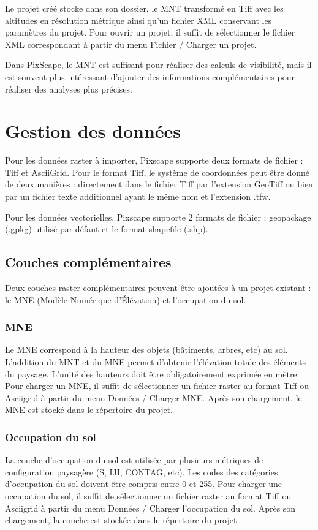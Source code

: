 \documentclass{report}
\begin{document}
Le projet créé stocke dans son dossier, le MNT transformé en Tiff avec les altitudes en résolution métrique ainsi qu'un fichier XML conservant les paramètres du projet.
Pour ouvrir un projet, il suffit de sélectionner le fichier XML correspondant à partir du menu Fichier / Charger un projet.

Dans PixScape, le MNT est suffisant pour réaliser des calculs de visibilité, mais il est souvent plus intéressant d'ajouter des informations complémentaires pour réaliser des analyses plus précises.

\section{Gestion des données}

Pour les données raster à importer, Pixscape supporte deux formats de fichier : Tiff et AsciiGrid. Pour le format Tiff, le système de coordonnées peut être donné de deux manières : directement dans le fichier Tiff par l'extension GeoTiff ou bien par un fichier texte additionnel ayant le même nom et l'extension .tfw. 

Pour les données vectorielles, Pixscape supporte 2 formats de fichier : geopackage (.gpkg) utilisé par défaut et le format shapefile (.shp).

\subsection{Couches complémentaires}
Deux couches raster complémentaires peuvent être ajoutées à un projet existant : le MNE (Modèle Numérique d'Élévation) et l'occupation du sol.

\subsubsection{MNE}
Le MNE correspond à la hauteur des objets (bâtiments, arbres, etc) au sol. L'addition du MNT et du MNE permet d'obtenir l'élévation totale des éléments du paysage. L'unité des hauteurs doit être obligatoirement exprimée en mètre. Pour charger un MNE, il suffit de sélectionner un fichier raster au format Tiff ou Asciigrid à partir du menu Données / Charger MNE. Après son chargement, le MNE est stocké dans le répertoire du projet.

\subsubsection{Occupation du sol}
La couche d'occupation du sol est utilisée par plusieurs métriques de configuration paysagère (S, IJI, CONTAG, etc). Les codes des catégories d'occupation du sol doivent être compris entre 0 et 255. Pour charger une occupation du sol, il suffit de sélectionner un fichier raster au format Tiff ou Asciigrid à partir du menu Données / Charger l'occupation du sol. Après son chargement, la couche est stockée dans le répertoire du projet.
\end{document}
